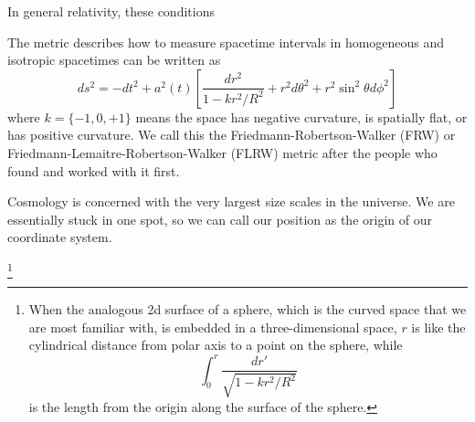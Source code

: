 In general relativity, these conditions 

The metric describes how to measure spacetime intervals in homogeneous and isotropic spacetimes can be written as
\begin{equation}
  ds^2 = -dt^2 + a^2(t)\left[ \frac{dr^2}{1 - kr^2/R^2} + r^2 d\theta^2 + r^2 \sin^2\theta d\phi^2  \right]
\end{equation}
where $k = \{ -1, 0, +1 \}$ means the space has negative curvature, is spatially flat, or has positive curvature.  We call this the Friedmann-Robertson-Walker (FRW) or Friedmann-Lemaitre-Robertson-Walker (FLRW) metric after the people who found and worked with it first.

Cosmology is concerned with the very largest size scales in the universe.  We are essentially stuck in one spot, so we can call our position as the origin of our coordinate system. 


\footnote{When the analogous 2d surface of a sphere, which is the curved space that we are most familiar with, is embedded in a three-dimensional space, $r$ is like the cylindrical distance from polar axis to a point on the sphere, while \begin{equation} \int_0^r \frac{dr'}{\sqrt{1-kr^2/R^2}} \end{equation} is the length from the origin along the surface of the sphere.}
